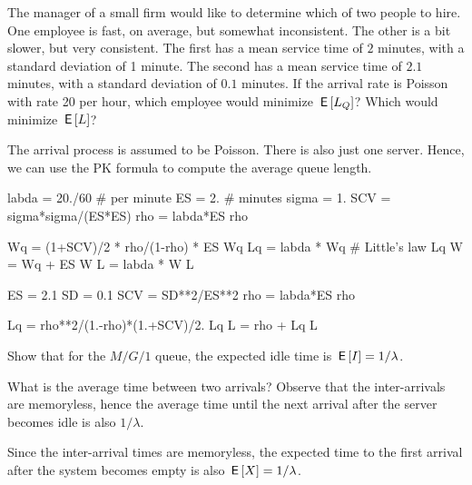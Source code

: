 \begin{exercise}[Hall 5.16] \label{ex:46}The manager of a small firm would like to determine which of two people to hire.
  One employee is fast, on average, but somewhat inconsistent.
  The other is a bit slower, but very consistent.
  The first has a mean service time of $2$ minutes, with a standard deviation of 1 minute.
  The second has a mean service time of $2.1$ minutes, with a standard deviation of $0.1$ minutes.
  If the arrival rate is Poisson with rate 20 per hour, which employee would minimize $\,\mathsf{E}\left[L_Q\right]$?
  Which would minimize $\,\mathsf{E}\left[L\right]$?
  \begin{solution}
    The arrival process is assumed to be Poisson. There is also
    just one server. Hence, we can use the PK formula to compute the average queue length.

\begin{pyconsole}
labda = 20./60 # per minute
ES = 2. # minutes
sigma = 1.
SCV = sigma*sigma/(ES*ES)
rho = labda*ES
rho

Wq = (1+SCV)/2 * rho/(1-rho) * ES
Wq
Lq = labda * Wq # Little's law
Lq
W = Wq + ES
W
L = labda * W
L
\end{pyconsole}


\begin{pyconsole}
ES = 2.1
SD = 0.1
SCV = SD**2/ES**2
rho = labda*ES
rho

Lq = rho**2/(1.-rho)*(1.+SCV)/2.
Lq
L = rho + Lq
L
\end{pyconsole}

  \end{solution}
\end{exercise}


\begin{extra}
  Show that for the $M/G/1$ queue, the expected idle time is
  $\,\mathsf{E}\left[I\right] = 1/\lambda$.  
  \begin{hint}
What is the average time between two
    arrivals? Observe that the inter-arrivals are memoryless, hence the
    average time until the next arrival after the server becomes idle
    is also $1/\lambda$.
  \end{hint}
  \begin{solution}
    Since the inter-arrival times are memoryless, the expected time to the first arrival after the system becomes empty is also $\,\mathsf{E}\left[X\right]=1/\lambda$.
  \end{solution}
\end{extra}

